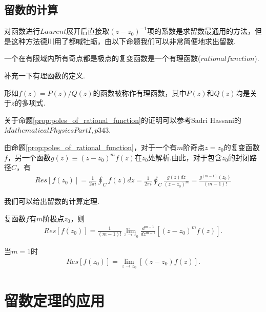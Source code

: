     \subsection{留数的计算}
        对函数进行$Laurent$展开后直接取$(z-z_0)^{-1}$项的系数是求留数最通用的方法，但是这种方法德川用了都喊牡蛎，由以下命题我们可以非常简便地求出留数.

        \begin{proposition}\label{prop:poles_of_rational_function}
            一个在有限域内所有奇点都是极点的复变函数是一个有理函数($rational function$).
        \end{proposition}

        补充一下有理函数的定义.

        \begin{definition}
            形如$f(z)=P(z)/Q(z)$的函数被称作有理函数，其中$P(z)$和$Q(z)$均是关于$z$的多项式.
        \end{definition}
        
        关于命题\ref{prop:poles_of_rational_function}的证明可以参考Sadri Hassani的$Mathematical Physics PartI, p343$.

        由命题\ref{prop:poles_of_rational_function}，对于一个有$m$阶奇点$z=z_0$的复变函数$f$，另一个函数$g(z)\equiv (z-z_0)^mf(z)$在$z_0$处解析.由此，对于包含$z_0$的封闭路径$C$，有
        \begin{align*}
            Res[f(z_0)]=\frac1{2\pi i}\oint_{C}f(z)dz=\frac1{2\pi i}\oint_C \frac{g(z)dz}{(z-z_0)^m}=\frac{g^{(m-1)}(z_0)}{(m-1)!}
        \end{align*}

        我们可以给出留数的计算定理.

        \begin{theorem}
            复函数$f$有$m$阶极点$z_0$，则
            \begin{align*}
                Res\left[f(z_0)\right]=\frac1{(m-1)!}\lim_{z\to z_0}\frac{d^{m-1}}{dz^{m-1}}\left[(z-z_0)^mf(z)\right].
            \end{align*}
        \end{theorem}

        当$m=1$时
        \begin{align*}
            Res\left[f(z_0)\right]=\lim_{z\to z_0}\left[(z-z_0)f(z)\right].
        \end{align*}

\section{留数定理的应用}
